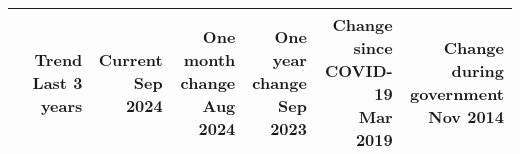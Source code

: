 \begin{table}[H]
\begin{tabular}{l r r r r r r}
\hline
  & \thead[r]{\textbf{Trend} \\ \small{Last 3 years}} & \thead[r]{\textbf{Current} \\ \small{Sep 2024}} & \thead[r]{\textbf{One month} \\ \textbf{change} \\ \small{Aug 2024}} & \thead[r]{\textbf{One year} \\ \textbf{change} \\ \small{Sep 2023}} & \thead[r]{\textbf{Change since} \\ \textbf{COVID-19} \\ \small{Mar 2019}} & \thead[r]{\textbf{Change during} \\ \textbf{government} \\ \small{Nov 2014}} \\
\hline
\end{tabular}
\end{table}

